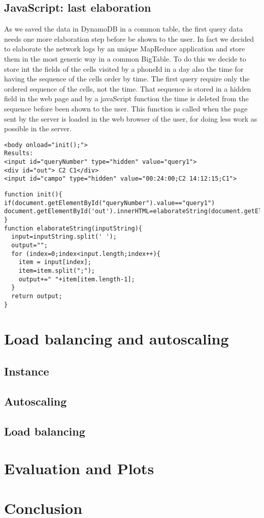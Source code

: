 \documentclass{article}
\begin{document}
\subsection{JavaScript: last elaboration}
As we saved the data in DynamoDB in a common table, the first query data needs one more elaboration step 
before be shown to the user. In fact we decided to elaborate the network logs by an unique MapReduce application
and store them in the most generic way in a common BigTable. To do this we decide to store int the fields of
the cells visited by a phoneId in a day also the time for having the sequence of the cells order by time.
The first query require only the ordered sequence of the cells, not the time. That sequence is stored in 
a hidden field in the web page and by a javaScript function the time is deleted from the sequence before 
been shown to the user. This function is called when the page sent by the server is loaded in the web 
browser of the user, for doing less work as possible in the server.
\begingroup \fontsize{7pt}{7pt}\selectfont
\begin{verbatim}
<body onload="init();">
Results:
<input id="queryNumber" type="hidden" value="query1">
<div id="out"> C2 C1</div>
<input id="campo" type="hidden" value="00:24:00;C2 14:12:15;C1">
\end{verbatim}
\begin{verbatim}
function init(){
if(document.getElementById("queryNumber").value=="query1")
document.getElementById('out').innerHTML=elaborateString(document.getElementById('campo').value);
}
function elaborateString(inputString){
  input=inputString.split(' ');
  output="";
  for (index=0;index<input.length;index++){
    item = input[index];
    item=item.split(";");
    output+=" "+item[item.length-1];
  }
  return output;
} 
\end{verbatim}
 \endgroup
\section{Load balancing and autoscaling}
\subsection{Instance}
\subsection{Autoscaling}
\subsection{Load balancing}

\section{Evaluation and Plots}


\section{Conclusion}
\end{document}
